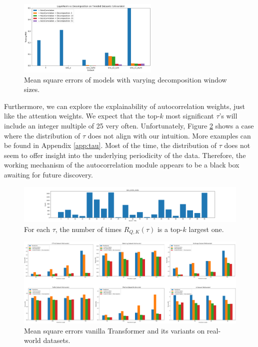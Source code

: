 \begin{figure}
    \centering
    \includegraphics[width=0.6\textwidth]{img/mse_trended_decomp.png}
    \caption{Mean square errors of models with varying decomposition window sizes.}
    \label{fig:lwin}
\end{figure}

Furthermore, we can explore the explainability of autocorrelation weights, just like the attention weights. 
We expect that the top-$k$ most significant $\tau$'s will include an integer multiple of 25 very often. 
Unfortunately, Figure \ref{fig:tau_synth} shows a case where the distribution of $\tau$ does not align with our intuition. 
More examples can be found in Appendix \ref{app:tau}. 
Most of the time, the distribution of $\tau$ does not seem to offer insight into the underlying periodicity of the data. 
Therefore, the working mechanism of the autocorrelation module appears to be a black box awaiting for future discovery. 

\begin{figure}
    \centering
    \includegraphics[width=\textwidth]{img/tau_sinx_sin2x_sin4x.png}
    \caption{For each $\tau$, the number of times $R_{Q, K}(\tau)$ is a top-$k$ largest one.}
    \label{fig:tau_synth}
\end{figure}

\begin{figure}
    \centering
    \includegraphics[width=\textwidth]{img/mse_real.png}
    \caption{Mean square errors vanilla Transformer and its variants on real-world datasets.}
\end{figure}

